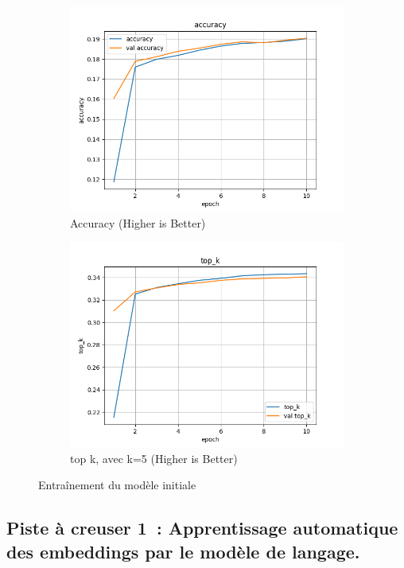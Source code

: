 \documentclass[a4paper]{article}
\begin{document}
\begin{figure}[ht]
  \begin{subfigure}{0.47\textwidth}
    \includegraphics[width=\linewidth]{../logs/word2vect/accuracy.png}
    \caption{Accuracy (Higher is Better)}
  \end{subfigure}
  \hfill
  \begin{subfigure}{0.47\textwidth}
    \includegraphics[width=\linewidth]{../logs/word2vect/top_k.png}
    \caption{top k, avec k=5 (Higher is Better)}
  \end{subfigure}
  \caption{Entraînement du modèle initiale}
  \label{subfig:result model 1}
\end{figure}


\subsection{Piste à creuser 1~: Apprentissage automatique des embeddings par le modèle de langage.}
\end{document}
